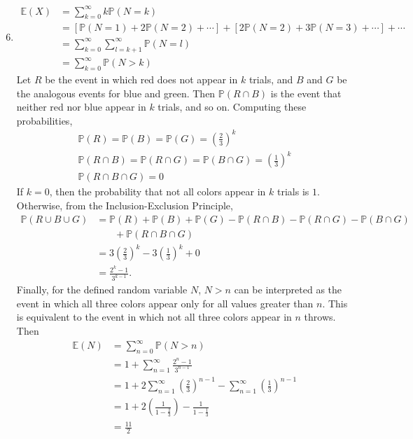 \documentclass[a4paper,12pt]{article}
\begin{document}
\begin{enumerate}
    \setcounter{enumi}{5}
    \item
        \begin{align*}
            \mathbb{E}(X) &= \sum_{k = 0}^\infty k\mathbb{P}(N = k) \\
            &= [\mathbb{P}(N = 1) + 2\mathbb{P}(N = 2) + \cdots] + [2\mathbb{P}(N = 2) + 3\mathbb{P}(N = 3) + \cdots] + \cdots \\
            &= \sum_{k = 0}^\infty \sum_{l = k + 1}^\infty \mathbb{P}(N = l) \\
            &= \sum_{k = 0}^\infty \mathbb{P}(N > k)
        \end{align*}
        Let $R$ be the event in which red does not appear in $k$ trials, and $B$ and $G$ be the analogous events for blue and green. Then $\mathbb{P}(R \cap B)$ is the event that neither red nor blue appear in $k$ trials, and so on. Computing these probabilities,
        \begin{gather*}
            \mathbb{P}(R) = \mathbb{P}(B) = \mathbb{P}(G) = \left( \frac{2}{3} \right)^k \\
            \mathbb{P}(R \cap B) = \mathbb{P}(R \cap G) = \mathbb{P}(B \cap G) = \left( \frac{1}{3} \right)^k \\
            \mathbb{P}(R \cap B \cap G) = 0
        \end{gather*}
        If $k = 0$, then the probability that not all colors appear in $k$ trials is $1$. Otherwise, from the Inclusion-Exclusion Principle,
        \begin{align*}
            \mathbb{P}(R \cup B \cup G) &= \mathbb{P}(R) + \mathbb{P}(B) + \mathbb{P}(G) - \mathbb{P}(R \cap B) - \mathbb{P}(R \cap G) - \mathbb{P}(B \cap G) \\
            &\phantom{{}=1} + \mathbb{P}(R \cap B \cap G) \\
            &= 3\left( \frac{2}{3} \right)^k - 3\left( \frac{1}{3} \right)^k + 0 \\
            &= \frac{2^k - 1}{3^{k - 1}}.
        \end{align*}
        Finally, for the defined random variable $N$, $N > n$ can be interpreted as the event in which all three colors appear only for all values greater than $n$. This is equivalent to the event in which not all three colors appear in $n$ throws. Then
        \begin{align*}
            \mathbb{E}(N) &= \sum_{n = 0}^\infty \mathbb{P}(N > n) \\
            &= 1 + \sum_{n = 1}^\infty \frac{2^n - 1}{3^{n - 1}} \\
            &= 1 + 2\sum_{n = 1}^\infty \left( \frac{2}{3} \right)^{n - 1} - \sum_{n = 1}^\infty \left( \frac{1}{3} \right)^{n - 1} \\
            &= 1 + 2\left( \frac{1}{1 - \frac{2}{3}} \right) - \frac{1}{1 - \frac{1}{3}} \\
            &= \frac{11}{2}
        \end{align*}


\end{enumerate}
\end{document}
